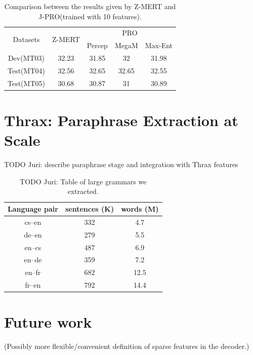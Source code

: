 \documentclass[11pt]{article}
\begin{document}
\begin{table}
\centering
\begin{tabular}{|c|c|c|c|c|}
\multirow{2}{*}{Datasets} & \multirow{2}{*}{Z-MERT} & \multicolumn{3}{c}{PRO} \\
            &       &Percep &MegaM &Max-Ent\\
\hline\hline
Dev(MT03)   &32.23  &31.85  &32     &31.98\\
Test(MT04)  &32.56  &32.65  &32.65  &32.55\\
Test(MT05)  &30.68  &30.87  &31     &30.89\\
\end{tabular}
\caption{\label{table:pro} Comparison between the results given by Z-MERT and J-PRO(trained with 10 features).}
\end{table}


\section{Thrax: Paraphrase Extraction at Scale}

TODO Juri: describe paraphrase stage and integration with Thrax
features

\begin{table}
\centering
\begin{tabular}{|c|c|c|}
Language pair & sentences (K) & words (M) \\
\hline\hline
cs--en & 332 & 4.7 \\
de--en & 279 & 5.5 \\
en--cs & 487 & 6.9 \\
en--de & 359 & 7.2 \\
en--fr & 682 & 12.5 \\
fr--en & 792 & 14.4 \\
\end{tabular}
\caption{TODO Juri: Table of large grammars we extracted.}
\end{table}

\section{Future work}

(Possibly more flexible/convenient definition of sparse features in the decoder.)





\end{document}
